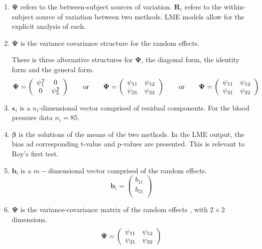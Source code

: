 \documentclass[12pt, a4paper]{article}
\begin{document}
\begin{enumerate}
\item $\boldsymbol{\Psi}$ refers to the between-subject sources of variation. $\boldsymbol{R}_{i}$ refers to the within-subject
source of variation between two methods. LME models allow for the explicit analysis of each.

\item $\boldsymbol{\Psi}$ is the variance covariance structure for the random effects.


There is three alternative structures for
$\boldsymbol{\Psi}$, the diagonal form, the identity form and the general form.
\[
\boldsymbol{\Psi} =
\left(%
\begin{array}{c c}
  \psi^2_1 & 0  \\
  0 & \psi^2_2  \\
\end{array}%
\right)\qquad \mathrm{or} \qquad \boldsymbol{\Psi} =
\left(%
\begin{array}{c c}
  \psi_{11} & \psi_{12}  \\
  \psi_{21} & \psi_{22}  \\
\end{array}%
\right)
\qquad \mathrm{or} \qquad \boldsymbol{\Psi} =
\left(%
\begin{array}{c c}
  \psi_{11} & \psi_{12}  \\
  \psi_{21} & \psi_{22}  \\
\end{array}%
\right)
\]



\item $\boldsymbol{\epsilon}_{i}$ is a $n_{i}$-dimensional vector
comprised of residual components. For the blood pressure data $n_{i} = 85$.

\item $\boldsymbol{\beta}$ is the solutions of the means of the two methods. In the LME output, the bias ad corresponding
t-value and p-values are presented. This is relevant to Roy's first test.

\item $\boldsymbol{b}_{i}$ is a $m-$dimensional vector comprised of
the random effects.
\begin{equation}
\boldsymbol{b}_{i} = \left( \begin{array}{c}
  b_{1i} \\
  b_{21}  \\
\end{array}\right)
\end{equation}

\item $\boldsymbol{\Psi}$ is the variance-covariance matrix of the random effects ,
with $2 \times 2$ dimensions.
\begin{equation}
\boldsymbol{\Psi} =
\left(%
\begin{array}{c c}
  \psi_{11} & \psi_{12}  \\
  \psi_{21} & \psi_{22}  \\
\end{array}%
\right)
\end{equation}


\end{enumerate}
\end{document}
